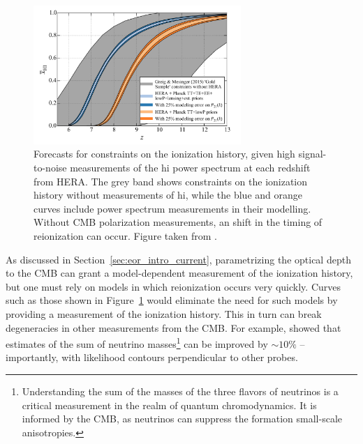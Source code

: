 \begin{figure}
\centering
\includegraphics[width=0.7\textwidth]{chapters/eor_intro/figures/Liu_history.png}
\caption[Forecasts for constraints on the ionization history, given high signal-to-noise measurements of the {\sc hi} power spectrum at each redshift from HERA.]{Forecasts for constraints on the ionization history, given high signal-to-noise measurements of the {\sc hi} power spectrum at each redshift from HERA. The grey band shows constraints on the ionization history without measurements of {\sc hi}, while the blue and orange curves include power spectrum measurements in their modelling. Without CMB polarization measurements, an shift in the timing of reionization can occur. Figure taken from \cite{Liu.16}.}
\label{fig:eor_intro_liu_history}
\end{figure}

As discussed in Section~\ref{sec:eor_intro_current}, parametrizing the optical depth to the CMB can grant a model-dependent measurement of the ionization history, but one must rely on models in which reionization occurs very quickly. Curves such as those shown in Figure~\ref{fig:eor_intro_liu_history} would eliminate the need for such models by providing a measurement of the ionization history. This in turn can break degeneracies in other measurements from the CMB. For example, \cite{Liu.16.tau} showed that estimates of the sum of neutrino masses\footnote{Understanding the sum of the masses of the three flavors of neutrinos is a critical measurement in the realm of quantum chromodynamics. It is informed by the CMB, as neutrinos can suppress the formation small-scale anisotropies.} can be improved by $\sim10\%$ -- importantly, with likelihood contours perpendicular to other probes.

